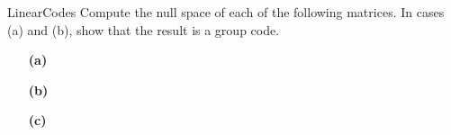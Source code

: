 \begin{exercise}{LinearCodes}
Compute the null space of each of the following matrices.  
In cases (a) and (b), show that the result is a group code.
  
\vspace{3pt}        %
 
\hspace{-7pt}
\begin{minipage}[t]{4.6in}
\noindent
\begin{minipage}[t]{2.25in}
\begin{itemize}
 
 \item[{\bf (a)}]
  
\end{itemize}
\end{minipage} \hfill
\begin{minipage}[t]{2.25in}
\begin{itemize}
 
 \item[{\bf (b)}]
 
\end{itemize}
\end{minipage}
\end{minipage}


\vspace{3pt}        %
\hspace{-7pt}
\begin{minipage}[t]{4.6in}
\noindent
\begin{minipage}[t]{2.25in}
\begin{itemize}
 
 \item[{\bf (c)}]
 

\end{itemize}
\end{minipage}
\end{minipage}
\end{exercise}
